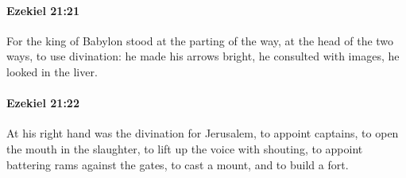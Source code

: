 		\paragraph{Ezekiel 21:21} %
			\label{EZEKIEL-21-21}

			For the king of Babylon stood at the parting of the way, at the head of the two ways, to use divination: he made his arrows bright, he consulted with images, he looked in the liver.


		\paragraph{Ezekiel 21:22} %
			\label{EZEKIEL-21-22}

			At his right hand was the divination for Jerusalem, to appoint captains, to open the mouth in the slaughter, to lift up the voice with shouting, to appoint battering rams against the gates, to cast a mount, and to build a fort.

